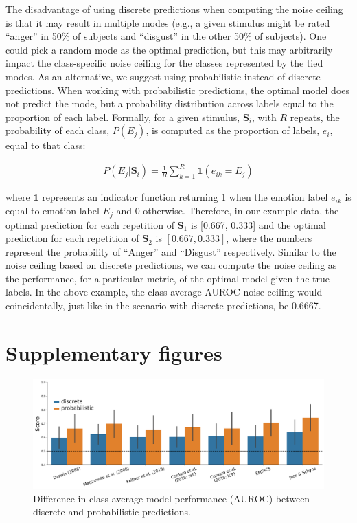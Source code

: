 \documentclass[12pt,american,a4paper,oneside,]{memoir} %
\begin{document}
The disadvantage of using discrete predictions when computing the noise ceiling is that it may result in multiple modes (e.g., a given stimulus might be rated ``anger'' in 50\% of subjects and ``disgust'' in the other 50\% of subjects). One could pick a random mode as the optimal prediction, but this may arbitrarily impact the class-specific noise ceiling for the classes represented by the tied modes. As an alternative, we suggest using probabilistic instead of discrete predictions. When working with probabilistic predictions, the optimal model does not predict the mode, but a probability distribution across labels equal to the proportion of each label. Formally, for a given stimulus, \(\mathbf{S}_{i}\), with \(R\) repeats, the probability of each class, \(P(E_{j})\), is computed as the proportion of labels, \(e_{i}\), equal to that class:

\begin{align}
P(E_{j} | \mathbf{S}_{i}) = \frac{1}{R}\sum_{k=1}^{R} \boldsymbol{1}(e_{ik} = E_{j})
\end{align}

where \(\boldsymbol{1}\) represents an indicator function returning 1 when the emotion label \(e_{ik}\) is equal to emotion label \(E_{j}\) and 0 otherwise. Therefore, in our example data, the optimal prediction for each repetition of \(\mathbf{S}_{1}\) is {[}0.667, 0.333{]} and the optimal prediction for each repetition of \(\mathbf{S}_{2}\) is \([0.667, 0.333]\), where the numbers represent the probability of ``Anger'' and ``Disgust'' respectively. Similar to the noise ceiling based on discrete predictions, we can compute the noise ceiling as the performance, for a particular metric, of the optimal model given the true labels. In the above example, the class-average AUROC noise ceiling would coincidentally, just like in the scenario with discrete predictions, be 0.6667.

\hypertarget{hka-supp-fig}{%
\section{Supplementary figures}\label{hka-supp-fig}}

\begin{figure}
\centering
\includegraphics{_bookdown_files/hypothesis-kernel-analysis-files/figures/figure_S1.pdf}
\caption{\label{fig:fig-hka-S1}Difference in class-average model performance (AUROC) between discrete and probabilistic predictions.}
\end{figure}
\end{document}
